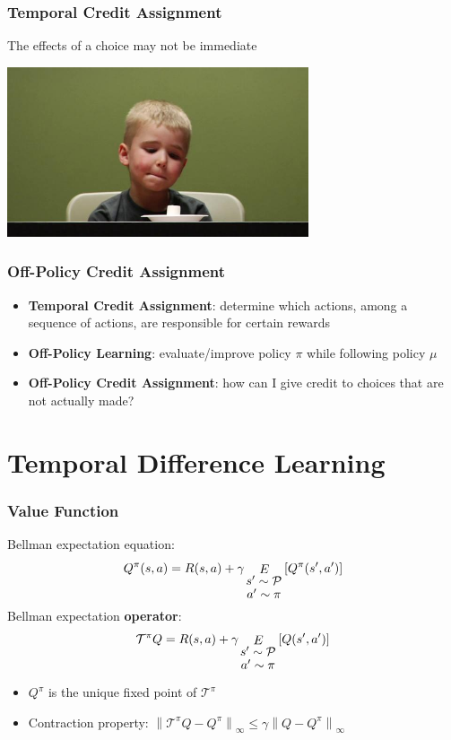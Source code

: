 \documentclass{beamer}
\newcommand{\expect}[2]{\mathop{E}_{#1}\left[#2\right]}
\newcommand{\norm}[2][\infty]{\left\|#2\right\|_{#1}}
\begin{document}
\begin{frame}
\frametitle{Temporal Credit Assignment}
The effects of a choice may not be immediate 

\vfill
\centering
\centerline{\includegraphics[height=5cm]{images/marshmallow}}
\end{frame}

\begin{frame}
\frametitle{Off-Policy Credit Assignment}
\begin{itemize}
\item<1-2> \textbf{Temporal Credit Assignment}: determine which actions, among a sequence of actions, are responsible for certain rewards
\item<2> \textbf{Off-Policy Learning}: evaluate/improve policy $\pi$ while following policy $\mu$
\item<3-> \textbf{Off-Policy Credit Assignment}: how can I give credit to choices that are not actually made?
\end{itemize}
\end{frame}

\section{Temporal Difference Learning}
\frame{\tableofcontents[currentsection]}
\begin{frame}
\frametitle{Value Function}
Bellman expectation equation:
\[
	Q^\pi(s,a) = R(s,a) + \gamma\expect{
	\shortstack{$s'\sim\mathcal{P}$\\$a'\sim\pi$}}{Q^\pi(s',a')}
\]
\pause
Bellman expectation \textbf{operator}:
\[
	\mathcal{T^{\pi}}Q = 
	R(s,a) + \gamma\expect{
		\shortstack{$s'\sim\mathcal{P}$\\$a'\sim\pi$}}{Q(s',a')}
\]
\begin{itemize}
\item<3-> $Q^{\pi}$ is the unique fixed point of $\mathcal{T^{\pi}}$
\item<4-> Contraction property: $\norm[\infty]{\mathcal{T}^{\pi}Q-Q^{\pi}} \leq \gamma\norm[\infty]{Q-Q^{\pi}}$
\end{itemize}
\end{frame}
\end{document}
